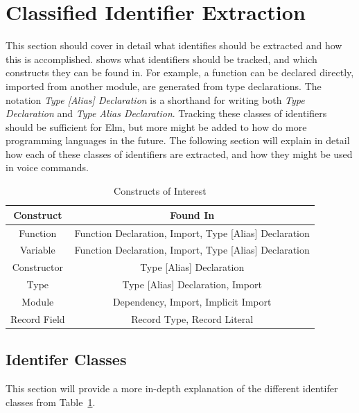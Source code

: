 \documentclass[../thesis.tex]{subfiles}
\begin{document}
\section{Classified Identifier Extraction}%
\label{sec:classified_identifier_extraction}
This section should cover in detail what identifies should be extracted
and how this is accomplished.  shows
what identifiers should be tracked, and which constructs they can be found in.
For example, a function can be declared directly, imported from another module, are generated
from type declarations. The notation \textit{Type [Alias] Declaration} is a shorthand
for writing both \textit{Type Declaration} and \textit{Type Alias Declaration}.
Tracking these classes of identifiers should be sufficient for Elm, but more
might be added to how do more programming languages in the future.
The following section will explain in detail how each of these classes of identifiers
are extracted, and how they might be used in voice commands.

\begin{table}[htpb]
    \begin{tabular}{|c|c|}
        \hline
        Construct & Found In \\
        \hline
        Function & Function Declaration, Import, Type [Alias] Declaration \\
        Variable & Function Declaration, Import, Type [Alias] Declaration \\
        Constructor & Type [Alias] Declaration \\
        Type & Type [Alias] Declaration, Import \\
        Module & Dependency, Import, Implicit Import \\
        Record Field & Record Type, Record Literal \\
        \hline
    \end{tabular}
    \caption{Constructs of Interest}
    \label{tab:constructs_of_interest}
\end{table}

\subsection{Identifer Classes}%
\label{sub:identifer_classes}
This section will provide a more in-depth explanation of the different identifer classes from Table~\ref{tab:constructs_of_interest}. 
\end{document}
